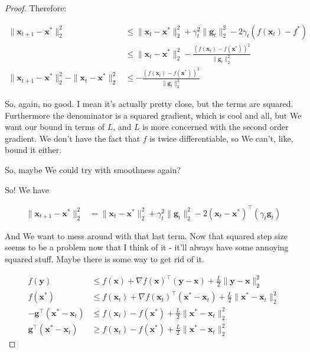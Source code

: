 \documentclass{article}
\begin{document}
\begin{proof}
	Therefore:
	
	\begin{align}
		\| \mathbf{x}_{t+1} - \mathbf{x}^*\|^2_2 &\le \|\mathbf{x}_t-\mathbf{x}^*\|^2_2 + \gamma_t^2\| \mathbf{g}_t\|^2_2 - 2\gamma_t(f(\mathbf{x}_t) - f^*)\\
		 &\le \|\mathbf{x}_t-\mathbf{x}^*\|^2_2 - \frac{ (f(\mathbf{x}_t) - f(\mathbf{x}^*))^2}{\|\mathbf{g}_t\|^2_2}\\
		 \| \mathbf{x}_{t+1} - \mathbf{x}^*\|^2_2 - \|\mathbf{x}_t-\mathbf{x}^*\|^2_2 &\le  - \frac{ (f(\mathbf{x}_t) - f(\mathbf{x}^*))^2}{\|\mathbf{g}_t\|^2_2}
	\end{align}
	
	So, again, no good. I mean it's actually pretty close, but the terms are squared. Furthermore the denominator is a squared gradient, which is cool and all, but We want our bound in terms of $L$, and $L$ is more concerned with the second order gradient. We don't have the fact that $f$ is twice differentiable, so We can't, like, bound it either. 
	
	So, maybe We could try with smoothness again? 
	
	So! We have
	
	\begin{align}
		\| \mathbf{x}_{t+1} - \mathbf{x}^*\|^2_2  &= \|\mathbf{x}_t-\mathbf{x}^*\|^2_2 + \gamma_t^2\| \mathbf{g}_t\|^2_2 - 2(\mathbf{x}_t-\mathbf{x}^*)^\top(\gamma_t \mathbf{g}_t) 
	\end{align}
	
	And We want to mess around with that last term. Now that squared step size seems to be a problem now that I think of it - it'll always have some annoying squared stuff. Maybe there is some way to get rid of it. 
	
	\begin{align}
		f(\mathbf{y}) &\le f(\mathbf{x}) + \nabla f(\mathbf{x})^\top(\mathbf{y}-\mathbf{x}) + \frac{L}{2}\|\mathbf{y}-\mathbf{x}\|^2_2\\
		f(\mathbf{x}^*) &\le f(\mathbf{x}_t) + \nabla f(\mathbf{x}_t)^\top(\mathbf{x}^*-\mathbf{x}_t) + \frac{L}{2}\|\mathbf{x}^*-\mathbf{x}_t\|^2_2\\
		- \mathbf{g}^\top(\mathbf{x}^*-\mathbf{x}_t) &\le f(\mathbf{x}_t) -  f(\mathbf{x}^*)  + \frac{L}{2}\|\mathbf{x}^*-\mathbf{x}_t\|^2_2\\
		\mathbf{g}^\top(\mathbf{x}^*-\mathbf{x}_t) &\ge f(\mathbf{x}_t) -  f(\mathbf{x}^*)  + \frac{L}{2}\|\mathbf{x}^*-\mathbf{x}_t\|^2_2
	\end{align}
	

\end{proof}
\end{document}
